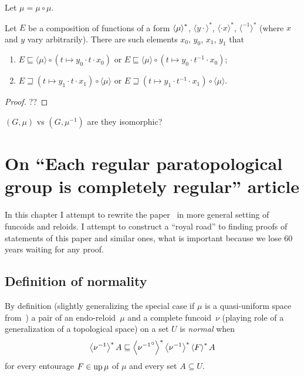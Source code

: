 \begin{prop}
  Let $\mu = \mu \circ \mu$.
  
  Let $E$ be a composition of functions of a form
  $\left\langle \mu\right\rangle ^{\ast}$, $\langle y \cdot
  \rangle^{\ast}$, $\langle \cdot x \rangle^{\ast}$, $\langle^{- 1}
  \rangle^{\ast}$ (where $x$ and $y$ vary arbitrarily). There are such
  elements $x_0$, $y_0$, $x_1$, $y_1$ that
  \begin{enumerate}
    \item $E \sqsubseteq \langle \mu \rangle \circ (t \mapsto y_0 \cdot t
    \cdot x_0)$ or $E \sqsubseteq \langle \mu \rangle \circ (t \mapsto y_0
    \cdot t^{- 1} \cdot x_0)$;
    
    \item $E \sqsupseteq (t \mapsto y_1 \cdot t \cdot x_1) \circ \langle \mu
    \rangle$ or $E \sqsupseteq (t \mapsto y_1 \cdot t^{- 1} \cdot x_1) \circ
    \langle \mu \rangle$.
  \end{enumerate}
\end{prop}

\begin{proof}
??
\end{proof}

$(G, \mu)$ vs $(G, \mu^{-1})$ are they isomorphic?

\section{On ``Each regular paratopological group is completely regular'' article}

In this chapter I attempt to rewrite the paper~\cite{2014arXiv1410.1504B} in more general setting of funcoids and reloids.
I attempt to construct a ``royal road'' to finding proofs of statements of this paper and similar ones, what is
important because we lose 60 years waiting for any proof.

\subsection{Definition of normality}

By definition (slightly generalizing the special case if $\mu$ is a
quasi-uniform space from~\cite{2014arXiv1410.1504B})
a pair of an endo-reloid~$\mu$ and a complete funcoid~$\nu$ (playing role of a generalization of a topological space)
on a set $U$ is \emph{normal} when
\[ \left\langle \nu^{-1}\right\rangle ^{\ast} A \sqsubseteq \left\langle 
{\nu^{-1}}^{\circ}\right\rangle ^{\ast} \left\langle \nu^{-1}\right\rangle ^{\ast} \left\langle F\right\rangle ^{\ast} A \] for every entourage $F \in
\operatorname{up} \mu$ of $\mu$ and every set $A \subseteq U$.

